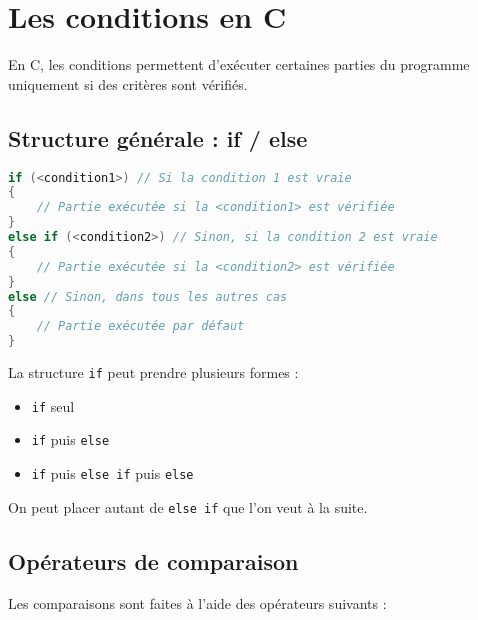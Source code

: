 
\section{Les conditions en C}

En C, les conditions permettent d'exécuter certaines parties du programme uniquement si des critères sont vérifiés.

\subsection{Structure générale : if / else}



\begin{lstlisting}[language=c]
if (<condition1>) // Si la condition 1 est vraie
{
    // Partie exécutée si la <condition1> est vérifiée
}
else if (<condition2>) // Sinon, si la condition 2 est vraie
{
    // Partie exécutée si la <condition2> est vérifiée
}
else // Sinon, dans tous les autres cas
{
    // Partie exécutée par défaut
}
\end{lstlisting}

La structure \texttt{if} peut prendre plusieurs formes :

\begin{itemize}
	\item \texttt{if} seul
	\item \texttt{if} puis \texttt{else}
	\item \texttt{if} puis \texttt{else if} puis \texttt{else}
\end{itemize}

On peut placer autant de \texttt{else if} que l'on veut à la suite.
\subsection{Opérateurs de comparaison}

Les comparaisons sont faites à l'aide des opérateurs suivants :

